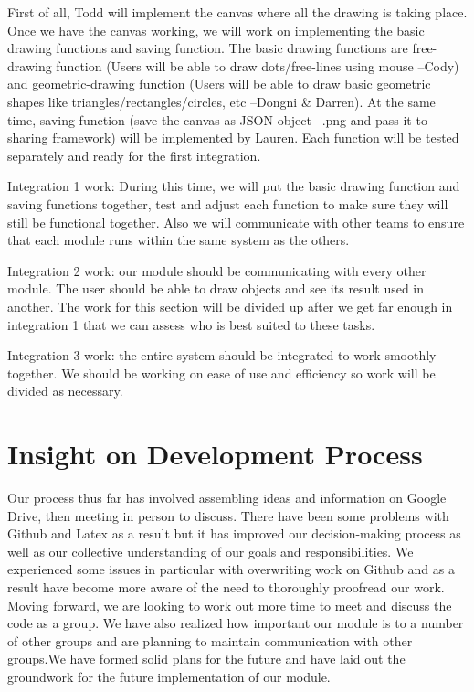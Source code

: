\documentclass[a4paper, 11pt]{article} %
\begin{document}
First of all, Todd will implement the canvas where all the drawing is taking place. Once we have the canvas working, we will work on implementing the basic drawing functions and saving function. The basic drawing functions are free-drawing function (Users will be able to draw dots/free-lines using mouse --Cody) and geometric-drawing function (Users will be able to draw basic geometric shapes like triangles/rectangles/circles, etc --Dongni \& Darren). At the same time, saving function (save the canvas as JSON object-- .png and pass it to sharing framework) will be implemented by Lauren. Each function will be tested separately and ready for the first integration.

Integration 1 work:
During this time,  we will put  the basic drawing function and saving functions together, test and adjust each function to make sure they will still be functional together. Also we will communicate with other teams to ensure that each module runs within the same system as the others.

Integration 2 work: our module should be communicating with every other module. The user should be able to draw objects  and see its result used in another. The work for this section will be divided up after we get far enough in integration 1 that we can assess who is best suited to these tasks.

Integration 3 work: the entire system should be integrated to work smoothly together. We should be working on ease of use and efficiency so work will be divided as necessary.


\section*{Insight on Development Process}

Our process thus far has involved assembling ideas and information on Google Drive, then meeting in person to discuss. There have been some problems with Github and Latex as a result but it has improved our decision-making process as well as our collective understanding of our goals and responsibilities. We experienced some issues in particular with overwriting work on Github and as a result have become more aware of the need to thoroughly proofread our work. Moving forward, we are looking to work out more time to meet and discuss the code as a group. We have also realized how important our module is to a number of other groups and are planning to maintain communication with other groups.We have formed solid plans for the future and have laid out the groundwork for the future implementation of our module. 
\end{document}
